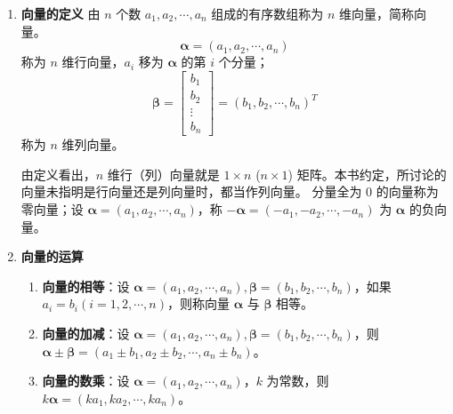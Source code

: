 \documentclass[UTF8]{ctexart}
\theoremstyle{mydef}
\begin{document}
\begin{enumerate}
    \item \textbf{向量的定义}
    由 $n$ 个数 $a_1, a_2, \cdots, a_n$ 组成的有序数组称为 $n$ 维向量，简称向量。
    $$ \boldsymbol{\alpha} = (a_1, a_2, \cdots, a_n) $$
    称为 $n$ 维行向量，$a_i$ 移为 $\boldsymbol{\alpha}$ 的第 $i$ 个分量；
    $$ \boldsymbol{\beta} = \begin{bmatrix} b_1 \\ b_2 \\ \vdots \\ b_n \end{bmatrix} = (b_1, b_2, \cdots, b_n)^T $$
    称为 $n$ 维列向量。
    
    由定义看出，$n$ 维行（列）向量就是 $1 \times n$ ($n \times 1$) 矩阵。本书约定，所讨论的向量未指明是行向量还是列向量时，都当作列向量。
    分量全为 0 的向量称为零向量；设 $\boldsymbol{\alpha} = (a_1, a_2, \cdots, a_n)$，称 $-\boldsymbol{\alpha} = (-a_1, -a_2, \cdots, -a_n)$ 为 $\boldsymbol{\alpha}$ 的负向量。
    
    \item \textbf{向量的运算}
    \begin{enumerate}
        \item \textbf{向量的相等}：设 $\boldsymbol{\alpha} = (a_1, a_2, \cdots, a_n), \boldsymbol{\beta} = (b_1, b_2, \cdots, b_n)$，如果 $a_i = b_i (i=1, 2, \cdots, n)$，则称向量 $\boldsymbol{\alpha}$ 与 $\boldsymbol{\beta}$ 相等。
        \item \textbf{向量的加减}：设 $\boldsymbol{\alpha} = (a_1, a_2, \cdots, a_n), \boldsymbol{\beta} = (b_1, b_2, \cdots, b_n)$，则 $\boldsymbol{\alpha} \pm \boldsymbol{\beta} = (a_1 \pm b_1, a_2 \pm b_2, \cdots, a_n \pm b_n)$。
        \item \textbf{向量的数乘}：设 $\boldsymbol{\alpha} = (a_1, a_2, \cdots, a_n)$，$k$ 为常数，则 $k\boldsymbol{\alpha} = (ka_1, ka_2, \cdots, ka_n)$。
    \end{enumerate}
    

\end{enumerate}
\end{document}
